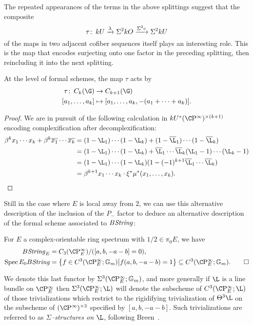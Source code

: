 The repeated appearances of the terms in the above splittings suggest that the composite \[\tau\colon\thinspace kU \xrightarrow{\lambda} \Sigma^2 kO \xrightarrow{\Sigma^2 c} \Sigma^2 kU\] of the maps in two adjacent cofiber sequences itself plays an interesting role.  This is the map that encodes surjecting onto one factor in the preceding splitting, then reincluding it into the next splitting.
\begin{lemma}
At the level of formal schemes, the map $\tau$ acts by
\begin{align*}
\tau\co C_k(\G) & \to C_{k+1}(\G) \\
[a_1, \ldots, a_k] & \mapsto [a_1, \ldots, a_k, -(a_1 + \cdots + a_k)].
\end{align*}
\end{lemma}
\begin{proof}
We are in pursuit of the following calculation in $kU^* (\CP^\infty)^{\times (k+1)}$ encoding complexification after decomplexification:
\begin{align*}
\beta^k x_1 \cdots x_k + \beta^k \overline{x_1} \cdots \overline{x_k} & = (1 - \L_1) \cdots (1 - \L_k) + (1 - \overline \L_1) \cdots (1 - \overline \L_k) \\
& = (1 - \L_1) \cdots (1 - \L_k) + \overline \L_1 \cdots \overline \L_k (\L_1 - 1) \cdots (\L_k - 1) \\
& = (1 - \L_1) \cdots (1 - \L_k) (1 - (-1)^{k+1} \overline \L_1 \cdots \overline \L_k) \\
& = \beta^{k+1} x_1 \cdots x_k \cdot \xi^* \mu^*(x_1, \ldots, x_k). \qedhere
\end{align*}
\end{proof}
Still in the case where $E$ is local away from $2$, we can use this alternative description of the inclusion of the $P_-$ factor to deduce an alternative description of the formal scheme associated to $B\mathit{String}$:
\begin{corollary}
For $E$ a complex-orientable ring spectrum with $1/2 \in \pi_0 E$, we have
\begin{align*}
B\String_E & = C_3(\CP^\infty_E) / ([a, b, -a-b] = 0), \\
\Spec E_0 B\String & = \left\{ f \in C^3(\CP^\infty_E; \Gm) \middle| f(a, b, -a-b) = 1 \right\} \subseteq C^3(\CP^\infty_E; \Gm). \qed
\end{align*}
\end{corollary}

\begin{definition}
We denote this last functor by $\Sigma^3(\CP^\infty_E; \Gm)$, and more generally if $\L$ is a line bundle on $\CP^\infty_E$ then $\Sigma^3(\CP^\infty_E; \L)$ will denote the subscheme of $C^3(\CP^\infty_E; \L)$ of those trivializations which restrict to the rigidifying trivialization of $\Theta^3 \L$ on the subscheme of $(\CP^\infty)^{\times 3}$ specified by $[a, b, -a-b]$.  Such trivializations are referred to as \textit{$\Sigma$--structures on $\L$}, following Breen~\cite[Section 5]{Breen}.
\end{definition}

